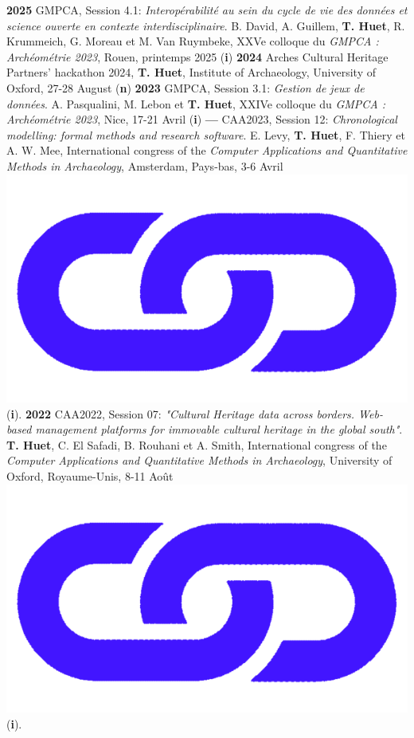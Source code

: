\documentclass{article}
\begin{document}
{\textbf{2025 }GMPCA, Session 4.1: \textit{Interopérabilité au sein du cycle de vie des données et science ouverte en contexte interdisciplinaire}. B. David, A. Guillem, \textbf{T. Huet}, R. Krummeich, G. Moreau et M. Van Ruymbeke, XXVe colloque du \textit{GMPCA : Archéométrie 2023}, Rouen, printemps 2025 (\textbf{i})
\smallbreak
\textbf{2024 }Arches Cultural Heritage Partners' hackathon 2024, \textbf{T. Huet}, Institute of Archaeology, University of Oxford, 27-28 August (\textbf{n})
\smallbreak
\textbf{2023 }GMPCA, Session 3.1: \textit{Gestion de jeux de données}. A. Pasqualini, M. Lebon et \textbf{T. Huet}, XXIVe colloque du \textit{GMPCA : Archéométrie 2023}, Nice, 17-21 Avril (\textbf{i})
\smallbreak
\textbf{--- }CAA2023, Session 12: \textit{Chronological modelling: formal methods and research software}. E. Levy, \textbf{T. Huet}, F. Thiery et A. W. Mee, International congress of the \textit{Computer Applications and Quantitative Methods in Archaeology}, Amsterdam, Pays-bas, 3-6 Avril \href{https://historical-time.github.io/caa23/s12/pres/#/title-slide}{\includegraphics[scale=0.02]{link_darkblue.png}} (\textbf{i}).
\smallbreak
\textbf{2022 }CAA2022, Session 07: \textit{"Cultural Heritage data across borders. Web-based management platforms for immovable cultural heritage in the global south"}. \textbf{T. Huet}, C. El Safadi, B. Rouhani et A. Smith, International congress of the \textit{Computer Applications and Quantitative Methods in Archaeology}, University of Oxford, Royaume-Unis, 8-11 Août \href{https://eamena-project.github.io/reveal.js/projects/caa22s07.html}{\includegraphics[scale=0.02]{link_darkblue.png}} (\textbf{i}). 
}
\end{document}
